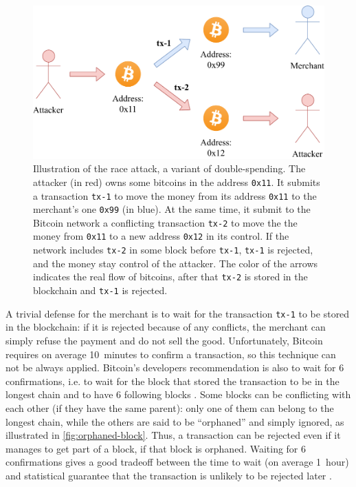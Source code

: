 \begin{figure}[t]
	\centering
	\vspace*{0.25cm}
	\includegraphics[scale=0.75]{figures/race_attack}
	\vspace*{0.25cm}
	\caption[Illustration of the race attack, a variant of double-spending]{
		Illustration of the race attack, a variant of double-spending.
		The attacker (in red) owns some bitcoins in the address \texttt{0x11}.
		It submits a transaction \texttt{tx-1} to move the money from its address \texttt{0x11} to the merchant's one \texttt{0x99} (in blue).
		At the same time, it submit to the Bitcoin network a conflicting transaction \texttt{tx-2} to move the the money from \texttt{0x11} to a new address \texttt{0x12} in its control.
		If the network includes \texttt{tx-2} in some block before \texttt{tx-1}, \texttt{tx-1} is rejected, and the money stay control of the attacker.
		The color of the arrows indicates the real flow of bitcoins, after that \texttt{tx-2} is stored in the blockchain and \texttt{tx-1} is rejected.
	}
	\label{fig:race-attack}
\end{figure}

A trivial defense for the merchant is to wait for the transaction \texttt{tx-1} to be stored in the blockchain:
if it is rejected because of any conflicts, the merchant can simply refuse the payment and do not sell the good.
Unfortunately, Bitcoin requires on average \SI{10}{minutes} to confirm a transaction, so this technique can not be always applied.
Bitcoin's developers recommendation is also to wait for \num{6} confirmations, i.e. to wait for the block that stored the transaction to be in the longest chain and to have \num{6} following blocks \cite{confirmation}.
Some blocks can be conflicting with each other (if they have the same parent):
only one of them can belong to the longest chain, while the others are said to be ``orphaned'' \cite{orphaned_block} and simply ignored, as illustrated in \cref{fig:orphaned-block}.
Thus, a transaction can be rejected even if it manages to get part of a block, if that block is orphaned.
Waiting for \num{6} confirmations gives a good tradeoff between the time to wait (on average \SI{1}{hour}) and statistical guarantee that the transaction is unlikely to be rejected later \cite{bitcoin_2009}.


